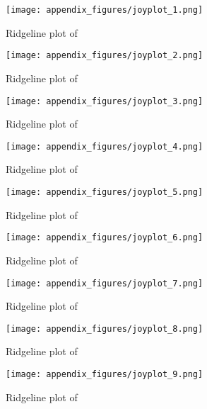 \begin{figure}[!ht]
    \centering
    \texttt{[image: appendix\_figures/joyplot\_1.png]}
    \caption{Ridgeline plot of  }
\end{figure}
\begin{figure}[!ht]
    \centering
    \texttt{[image: appendix\_figures/joyplot\_2.png]}
    \caption{Ridgeline plot of  }
\end{figure}
\begin{figure}[!ht]
    \centering
    \texttt{[image: appendix\_figures/joyplot\_3.png]}
    \caption{Ridgeline plot of  }
\end{figure}
\begin{figure}[!ht]
    \centering
    \texttt{[image: appendix\_figures/joyplot\_4.png]}
    \caption{Ridgeline plot of  }
\end{figure}
\begin{figure}[!ht]
    \centering
    \texttt{[image: appendix\_figures/joyplot\_5.png]}
    \caption{Ridgeline plot of  }
\end{figure}
\begin{figure}[!ht]
    \centering
    \texttt{[image: appendix\_figures/joyplot\_6.png]}
    \caption{Ridgeline plot of  }
\end{figure}
\begin{figure}[!ht]
    \centering
    \texttt{[image: appendix\_figures/joyplot\_7.png]}
    \caption{Ridgeline plot of  }
\end{figure}
\begin{figure}[!ht]
    \centering
    \texttt{[image: appendix\_figures/joyplot\_8.png]}
    \caption{Ridgeline plot of  }
\end{figure}
\begin{figure}[!ht]
    \centering
    \texttt{[image: appendix\_figures/joyplot\_9.png]}
    \caption{Ridgeline plot of  }
\end{figure}